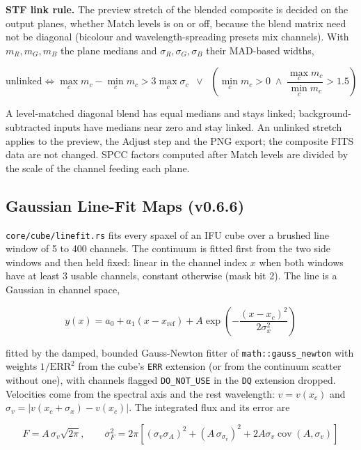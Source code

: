 \documentclass[11pt,a4paper]{article}
\newcommand{\code}[1]{\texttt{\small #1}}
\begin{document}
    \textbf{STF link rule.} The preview stretch of the blended composite is decided on the output planes, whether Match levels is on or off, because the blend matrix need not be diagonal (bicolour and wavelength-spreading presets mix channels). With $m_R, m_G, m_B$ the plane medians and $\sigma_R, \sigma_G, \sigma_B$ their MAD-based widths,

    \begin{equation}
        \text{unlinked} \iff \max_c m_c - \min_c m_c > 3 \max_c \sigma_c \;\;\lor\;\; \left(\min_c m_c > 0 \;\land\; \frac{\max_c m_c}{\min_c m_c} > 1.5\right)
    \end{equation}

    A level-matched diagonal blend has equal medians and stays linked; background-subtracted inputs have medians near zero and stay linked. An unlinked stretch applies to the preview, the Adjust step and the PNG export; the composite FITS data are not changed. SPCC factors computed after Match levels are divided by the scale of the channel feeding each plane.

    \subsection{Gaussian Line-Fit Maps (v0.6.6)}
    \label{sec:linefit_math}

    \code{core/cube/linefit.rs} fits every spaxel of an IFU cube over a brushed line window of 5 to 400 channels. The continuum is fitted first from the two side windows and then held fixed: linear in the channel index $x$ when both windows have at least 3 usable channels, constant otherwise (mask bit 2). The line is a Gaussian in channel space,

    \begin{equation}
        y(x) = a_0 + a_1 (x - x_{\text{ref}}) + A \exp\!\left(-\frac{(x - x_c)^2}{2 \sigma_x^2}\right)
    \end{equation}

    fitted by the damped, bounded Gauss-Newton fitter of \code{math::gauss\_newton} with weights $1/\text{ERR}^2$ from the cube's \code{ERR} extension (or from the continuum scatter without one), with channels flagged \code{DO\_NOT\_USE} in the \code{DQ} extension dropped. Velocities come from the spectral axis and the rest wavelength: $v = v(x_c)$ and $\sigma_v = \left| v(x_c + \sigma_x) - v(x_c) \right|$. The integrated flux and its error are

    \begin{equation}
        F = A \, \sigma_v \sqrt{2\pi}, \qquad
        \sigma_F^2 = 2\pi\left[(\sigma_v \sigma_A)^2 + (A\, \sigma_{\sigma_v})^2 + 2 A \sigma_v \operatorname{cov}(A, \sigma_v)\right]
    \end{equation}
\end{document}
